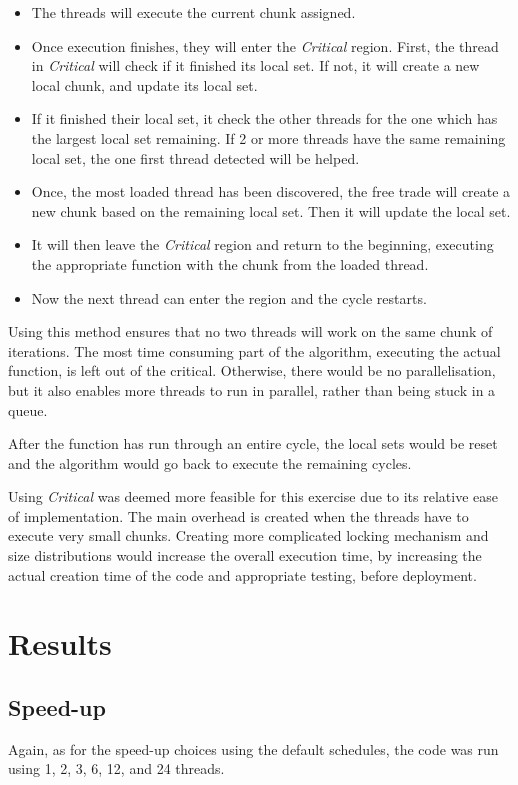 \documentclass[12pt]{article}
\begin{document}
	\begin{itemize}
		\item The threads will execute the current chunk assigned.
		\item Once execution finishes, they will enter the \textit{Critical} region. First, the thread in \textit{Critical} will check if it finished its local set. If not, it will create a new local chunk, and update its local set. 
		\item If it finished their local set, it check the other threads for the one which has the largest local set remaining. If 2 or more threads have the same remaining local set, the one first thread detected will be helped. 
		\item Once, the most loaded thread has been discovered, the free trade will create a new chunk based on the remaining local set. Then it will update the local set. 
		\item It will then leave the \textit{Critical} region and return to the beginning, executing the appropriate function with the chunk from the loaded thread.
		\item Now the next thread can enter the region and the cycle restarts.
	\end{itemize}
	
	Using this method ensures that no two threads will work on the same chunk of iterations. The most time consuming part of the algorithm, executing the actual function, is left out of the critical. Otherwise, there would be no parallelisation, but it also enables more threads to run in parallel, rather than being stuck in a queue.
	
	After the function has run through an entire cycle, the local sets would be reset and the algorithm would go back to execute the remaining cycles.
	
	Using \textit{Critical} was deemed more feasible for this exercise due to its relative ease of implementation. The main overhead is created when the threads have to execute very small chunks. Creating more complicated locking mechanism and size distributions would increase the overall execution time, by increasing the actual creation time of the code and appropriate testing, before deployment. 
	
	\pagebreak
	
	
	\section{Results}
	\subsection{Speed-up}
	Again, as for the speed-up choices using the default schedules, the code was run using 1, 2, 3, 6, 12, and 24 threads. 
	
\end{document}
